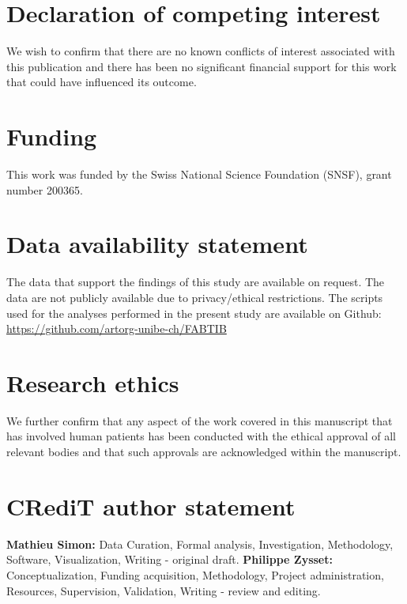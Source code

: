 \documentclass[a4paper,fleqn]{DC_ArtStyle}
\begin{document}
	
	\section*{Declaration of competing interest}
	We wish to confirm that there are no known conflicts of interest associated with this publication and there has been no significant financial support for this work that could have influenced its outcome.
	
	\section*{Funding}
	This work was funded by the Swiss National Science Foundation (SNSF), grant number 200365.

	\section*{Data availability statement}
	The data that support the findings of this study are available on request. The data are not publicly available due to privacy/ethical restrictions. The scripts used for the analyses performed in the present study are available on Github: \url{https://github.com/artorg-unibe-ch/FABTIB}
	
	\section*{Research ethics}
	We further confirm that any aspect of the work covered in this manuscript that has involved human patients has been conducted with the ethical approval of all relevant bodies and that such approvals are acknowledged within the manuscript.
	
	\section*{CRediT author statement}
	\textbf{Mathieu Simon:} Data Curation, Formal analysis, Investigation, Methodology, Software, Visualization, Writing - original draft.
	\textbf{Philippe Zysset:} Conceptualization, Funding acquisition, Methodology, Project administration, Resources, Supervision, Validation, Writing - review and editing.
	

	\nocite{*}
	
	
\end{document}
